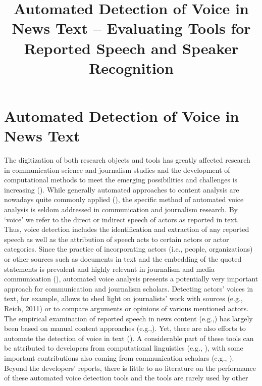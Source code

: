 \documentclass{ccr}
\title{Automated Detection of Voice in News Text – Evaluating Tools for Reported Speech and Speaker Recognition}
\begin{document}
\maketitle





\section{Automated Detection of Voice in News Text}The digitization of both research objects and tools has greatly affected research in communication science and journalism studies and the development of computational methods to meet the emerging possibilities and challenges is increasing (\cite{bennett1990toward, hepp2016kommunikations, löblich2010empirisch}). While generally automated approaches to content analysis are nowadays quite commonly applied (\cite{van2018communication}), the specific method of automated voice analysis is seldom addressed in communication and journalism research. By ‘voice’ we refer to the direct or indirect speech of actors as reported in text. Thus, voice detection includes the identification and extraction of any reported speech as well as the attribution of speech acts to certain actors or actor categories. Since the practice of incorporating actors (i.e., people, organizations) or other sources such as documents in text and the embedding of the quoted statements is prevalent and highly relevant in journalism and media communication (\cite{berkowitz2009reports}), automated voice analysis presents a potentially very important approach for communication and journalism scholars. Detecting actors’ voices in text, for example, allows to shed light on journalists’ work with sources (e.g., Reich, 2011) or to compare arguments or opinions of various mentioned actors. The empirical examination of reported speech in news content (e.g.,\cite{bennett1990toward}) has largely been based on manual content approaches (e.g.,\cite{crawley2016victims, fengler2020stumme}). Yet, there are also efforts to automate the detection of voice in text (\cite{krestel2008minding, lazaridou2017identifying, pouliquen2007automatic}). A considerable part of these tools can be attributed to developers from computational linguistics (e.g., \cite{brunner2015automatische, elson2010automatic, he-etal-2013-identification, muzny2017two, o2012sequence}), with some important contributions also coming from communication scholars (e.g., \cite{krestel2008minding, pouliquen2007automatic, scheible2016model, welbers2021extracting}). Beyond the developers' reports, there is little to no literature on the performance of these automated voice detection tools and the tools are rarely used by other 
\end{document}
